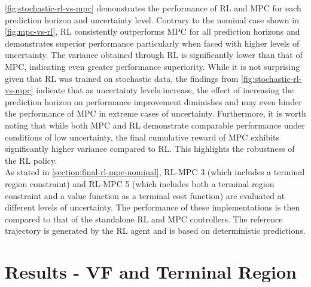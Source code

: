 \autoref{fig:stochastic-rl-vs-mpc} demonstrates the performance of RL and MPC for each prediction horizon and uncertainty level. Contrary to the nominal case shown in \ref{fig:mpc-vs-rl}, RL consistently outperforms MPC for all prediction horizons and demonstrates superior performance particularly when faced with higher levels of uncertainty. The variance obtained through RL is significantly lower than that of MPC, indicating even greater performance superiority. While it is not surprising given that RL was trained on stochastic data, the findings from \autoref{fig:stochastic-rl-vs-mpc} indicate that as uncertainty levels increase, the effect of increasing the prediction horizon on performance improvement diminishes and may even hinder the performance of MPC in extreme cases of uncertainty. Furthermore, it is worth noting that while both MPC and RL demonstrate comparable performance under conditions of low uncertainty, the final cumulative reward of MPC exhibits significantly higher variance compared to RL. This highlights the robustness of the RL policy.\\
As stated in \autoref{section:final-rl-mpc-nominal}, RL-MPC 3 (which includes a terminal region constraint) and RL-MPC 5 (which includes both a terminal region constraint and a value function as a terminal cost function) are evaluated at different levels of uncertainty. The performance of these implementations is then compared to that of the standalone RL and MPC controllers. The reference trajectory is generated by the RL agent and is based on deterministic predictions.





\section{Results - VF and Terminal Region}



